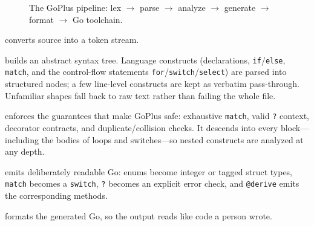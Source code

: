 \documentclass[11pt,a4paper]{article}
\begin{document}
\begin{figure}[h]
\centering
{}
\caption{The GoPlus pipeline: lex \(\rightarrow\) parse \(\rightarrow\) analyze
\(\rightarrow\) generate \(\rightarrow\) format \(\rightarrow\) Go toolchain.}
\end{figure}

\begin{description}[leftmargin=1.4em,style=nextline]
  \item[Lexer] converts source into a token stream.
  \item[Parser] builds an abstract syntax tree. Language constructs
        (declarations, \texttt{if}/\texttt{else}, \texttt{match}, and the control-flow
        statements \texttt{for}/\texttt{switch}/\texttt{select}) are parsed into
        structured nodes; a few line-level constructs are kept as verbatim
        pass-through. Unfamiliar shapes fall back to raw text rather than failing
        the whole file.
  \item[Semantic layer] enforces the guarantees that make GoPlus safe:
        exhaustive \texttt{match}, valid \texttt{?} context, decorator contracts,
        and duplicate/collision checks. It descends into every block---including
        the bodies of loops and switches---so nested constructs are analyzed at
        any depth.
  \item[Codegen] emits deliberately readable Go: enums become integer or tagged
        struct types, \texttt{match} becomes a \texttt{switch}, \texttt{?} becomes
        an explicit error check, and \texttt{@derive} emits the corresponding
        methods.
  \item[\texttt{gofmt}] formats the generated Go, so the output reads like code a
        person wrote.
\end{description}
\end{document}
